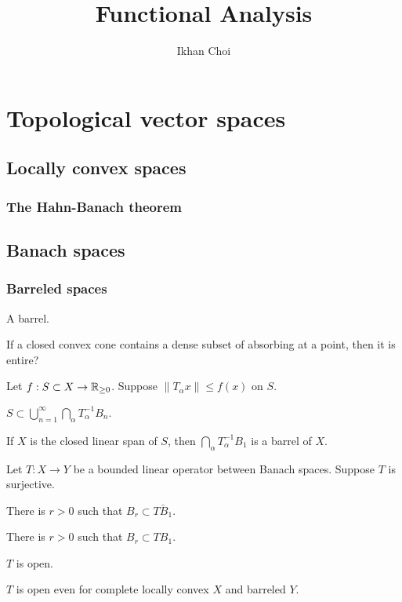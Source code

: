 \documentclass{../note}
\begin{document}
\title{Functional Analysis}
\author{Ikhan Choi}
\maketitle
\tableofcontents

\part{Topological vector spaces}

\chapter{Locally convex spaces}
\section{The Hahn-Banach theorem}


\chapter{Banach spaces}
\section{Barreled spaces}
\begin{prb}

\begin{parts}
\end{parts}
\end{prb}
\begin{prb}
A barrel.
\end{prb}

If a closed convex cone contains a dense subset of absorbing at a point, then it is entire?

\begin{prb}
Let $f:S\subset X\to\mathbb{R}_{\ge0}$.
Suppose $\|T_\alpha x\|\le f(x)$ on $S$.
\begin{parts}
\item $S\subset\bigcup_{n=1}^\infty\bigcap_\alpha T_\alpha^{-1}B_n$.
\item If $X$ is the closed linear span of $S$, then $\bigcap_\alpha T_\alpha^{-1}B_1$ is a barrel of $X$.
\end{parts}
\end{prb}


\begin{prb}
Let $T:X\to Y$ be a bounded linear operator between Banach spaces.
Suppose $T$ is surjective.
\begin{parts}
\item There is $r>0$ such that $B_r\subset\bar{TB_1}$.
\item There is $r>0$ such that $B_r\subset TB_1$.
\item $T$ is open.
\item $T$ is open even for complete locally convex $X$ and barreled $Y$.
\end{parts}
\end{prb}
\end{document}
